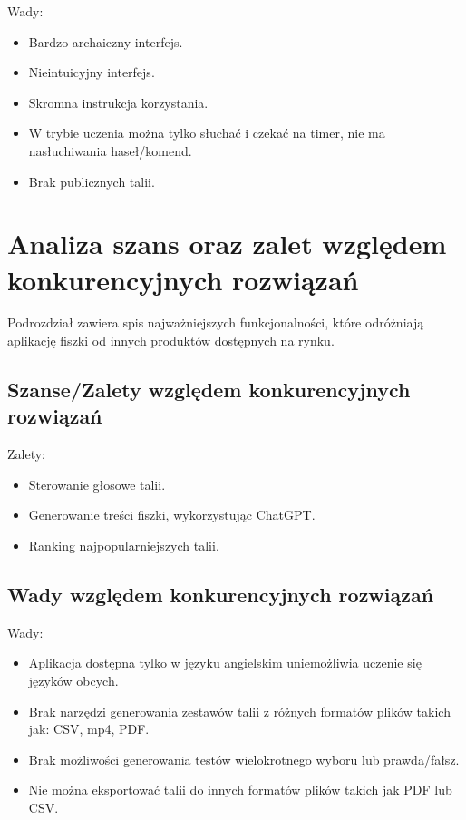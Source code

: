 Wady:
\begin{itemize}
    \item Bardzo archaiczny interfejs.
    \item Nieintuicyjny interfejs.
    \item Skromna instrukcja korzystania.
    \item W trybie uczenia można tylko słuchać i czekać na timer, nie ma nasłuchiwania haseł/komend.
    \item Brak publicznych talii.
\end{itemize}

\section{Analiza szans oraz zalet względem konkurencyjnych rozwiązań}

Podrozdział zawiera spis najważniejszych funkcjonalności, które odróżniają aplikację fiszki od innych produktów dostępnych na rynku.

\subsection{Szanse/Zalety względem konkurencyjnych rozwiązań}

Zalety:
\begin{itemize}
    \item Sterowanie głosowe talii.
    \item Generowanie treści fiszki, wykorzystując ChatGPT.
    \item Ranking najpopularniejszych talii.
\end{itemize}

\subsection{Wady względem konkurencyjnych rozwiązań}

Wady:
\begin{itemize}
    \item Aplikacja dostępna tylko w języku angielskim uniemożliwia uczenie się języków obcych.
    \item Brak narzędzi generowania zestawów talii z różnych formatów plików takich jak: CSV, mp4, PDF.
    \item Brak możliwości generowania testów wielokrotnego wyboru lub prawda/fałsz.
    \item Nie można eksportować talii do innych formatów plików takich jak PDF lub CSV.
\end{itemize}


